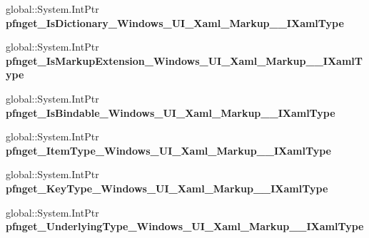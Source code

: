 \begin{DoxyCompactItemize}
global\+::\+System.\+Int\+Ptr {\bfseries pfnget\+\_\+\+Is\+Dictionary\+\_\+\+Windows\+\_\+\+U\+I\+\_\+\+Xaml\+\_\+\+Markup\+\_\+\+\_\+\+I\+Xaml\+Type}
\item 
\mbox{\label{struct_windows_1_1_u_i_1_1_xaml_1_1_markup_1_1_i_xaml_type_____impl_1_1_vtbl_a664cba7b39afac6b76d0badbd9f3b4e2}} 
global\+::\+System.\+Int\+Ptr {\bfseries pfnget\+\_\+\+Is\+Markup\+Extension\+\_\+\+Windows\+\_\+\+U\+I\+\_\+\+Xaml\+\_\+\+Markup\+\_\+\+\_\+\+I\+Xaml\+Type}
\item 
\mbox{\label{struct_windows_1_1_u_i_1_1_xaml_1_1_markup_1_1_i_xaml_type_____impl_1_1_vtbl_a47cd188e3a5dc374ae50f8851f888ece}} 
global\+::\+System.\+Int\+Ptr {\bfseries pfnget\+\_\+\+Is\+Bindable\+\_\+\+Windows\+\_\+\+U\+I\+\_\+\+Xaml\+\_\+\+Markup\+\_\+\+\_\+\+I\+Xaml\+Type}
\item 
\mbox{\label{struct_windows_1_1_u_i_1_1_xaml_1_1_markup_1_1_i_xaml_type_____impl_1_1_vtbl_aba17355fa4e3df5e6df8fd8703370cb6}} 
global\+::\+System.\+Int\+Ptr {\bfseries pfnget\+\_\+\+Item\+Type\+\_\+\+Windows\+\_\+\+U\+I\+\_\+\+Xaml\+\_\+\+Markup\+\_\+\+\_\+\+I\+Xaml\+Type}
\item 
\mbox{\label{struct_windows_1_1_u_i_1_1_xaml_1_1_markup_1_1_i_xaml_type_____impl_1_1_vtbl_a7f7005a4e1a8d70fdeeab8719f58997c}} 
global\+::\+System.\+Int\+Ptr {\bfseries pfnget\+\_\+\+Key\+Type\+\_\+\+Windows\+\_\+\+U\+I\+\_\+\+Xaml\+\_\+\+Markup\+\_\+\+\_\+\+I\+Xaml\+Type}
\item 
\mbox{\label{struct_windows_1_1_u_i_1_1_xaml_1_1_markup_1_1_i_xaml_type_____impl_1_1_vtbl_a6684ae05eead7ad150b5c925d23570f8}} 
global\+::\+System.\+Int\+Ptr {\bfseries pfnget\+\_\+\+Underlying\+Type\+\_\+\+Windows\+\_\+\+U\+I\+\_\+\+Xaml\+\_\+\+Markup\+\_\+\+\_\+\+I\+Xaml\+Type}
\item 
\mbox{\label{struct_windows_1_1_u_i_1_1_xaml_1_1_markup_1_1_i_xaml_type_____impl_1_1_vtbl_ab5d3ec13779f64778f700d3f3ee40298}} 

\end{DoxyCompactItemize}
